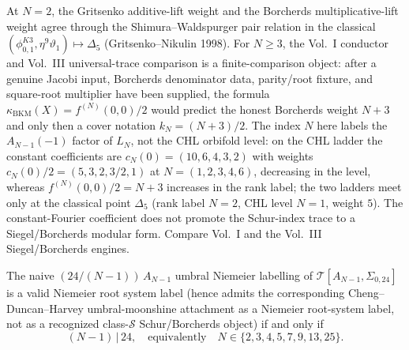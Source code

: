 \begin{remark}
\label{rem:wa-cross-volume}
At $N = 2$, the Gritsenko additive-lift weight and the Borcherds
multiplicative-lift weight agree through the Shimura--Waldspurger pair
relation in the classical
$(\phi_{0,1}^{K3}, \eta^9 \vartheta_1) \mapsto \Delta_5$
(Gritsenko--Nikulin 1998). For $N \ge 3$, the Vol.~I conductor and
Vol.~III universal-trace comparison is a finite-comparison object:
after a genuine Jacobi input, Borcherds denominator data, parity/root
fixture, and square-root multiplier have been supplied, the formula
$\kappa_{\mathrm{BKM}}(X)=f^{(N)}(0,0)/2$ would predict the honest Borcherds
weight $N+3$ and only then a cover notation $k_N=(N+3)/2$. The index
$N$ here labels the $A_{N-1}(-1)$ factor of $L_N$, not the CHL
orbifold level: on the CHL ladder the constant coefficients are
$c_N(0) = (10, 6, 4, 3, 2)$ with weights
$c_N(0)/2 = (5, 3, 2, 3/2, 1)$ at $N = (1, 2, 3, 4, 6)$, decreasing
in the level, whereas $f^{(N)}(0,0)/2 = N+3$ increases in the rank
label; the two ladders meet only at the classical point
$\Delta_5$ (rank label $N = 2$, CHL level $N = 1$, weight $5$). The
constant-Fourier coefficient does not promote the Schur-index trace to a
Siegel/Borcherds modular form. Compare Vol.~I and the Vol.~III
Siegel/Borcherds engines.
\end{remark}

\begin{theorem}
\label{thm:wa-divisor-rule}
The naive $(24/(N-1))\,A_{N-1}$ umbral Niemeier labelling of
$\mathcal T[A_{N-1}, \Sigma_{0, 24}]$ is a valid Niemeier root
system label (hence admits the corresponding Cheng--Duncan--Harvey
umbral-moonshine attachment as a Niemeier root-system label, not as a
recognized class-$\mathcal S$ Schur/Borcherds object) if and only if
\[
 (N - 1) \,\big|\, 24,
 \quad\text{equivalently}\quad
 N \in \{2, 3, 4, 5, 7, 9, 13, 25\}.
\]
\end{theorem}

